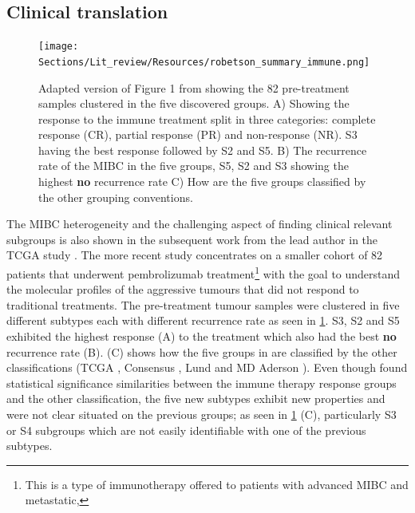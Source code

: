 \subsection{Clinical translation}


\begin{figure}[!htbp]    
    \centering
\texttt{[image: Sections/Lit\_review/Resources/robetson\_summary\_immune.png]}
    \caption{Adapted version of Figure 1 from \cite{Robertson2023-na} showing the 82 pre-treatment samples clustered in the five discovered groups. A) Showing the response to the immune treatment split in three categories: complete response (CR), partial response (PR) and non-response (NR). S3 having the best response followed by S2 and S5. B) The recurrence rate of the MIBC in the five groups, S5, S2 and S3 showing the highest \textbf{no} recurrence rate C) How are the five groups classified by the other grouping conventions.}
    \label{fig:lit:immune_rob}
\end{figure}


The MIBC heterogeneity and the challenging aspect of finding clinical relevant subgroups is also shown in the subsequent work \citet{Robertson2023-na} from the lead author in the TCGA study \cite{Robertson2017-mg}. The more recent study concentrates on a smaller cohort of 82 patients that underwent pembrolizumab treatment\footnote{This is a type of immunotherapy offered to patients with advanced MIBC and metastatic,} with the goal to understand the molecular profiles of the aggressive tumours that did not respond to traditional treatments. The pre-treatment tumour samples were clustered in five different subtypes each with different recurrence rate as seen in \cref{fig:lit:immune_rob}. S3, S2 and S5 exhibited the highest response (A) to the treatment which also had the best \textbf{no} recurrence rate (B).  (C) shows how the five groups in \cite{Robertson2023-na} are classified by the other classifications (TCGA \cite{Robertson2017-mg}, Consensus \cite{Kamoun2020-tj}, Lund \cite{Marzouka2018-ge} and MD Aderson \cite{Dadhania2016-cb}). Even though \citet{Robertson2023-na} found statistical significance similarities between the immune therapy response groups and the other classification, the five new subtypes exhibit new properties and were not clear situated on the previous groups; as seen in \cref{fig:lit:immune_rob} (C), particularly S3 or S4 subgroups which are not easily identifiable with one of the previous subtypes.


